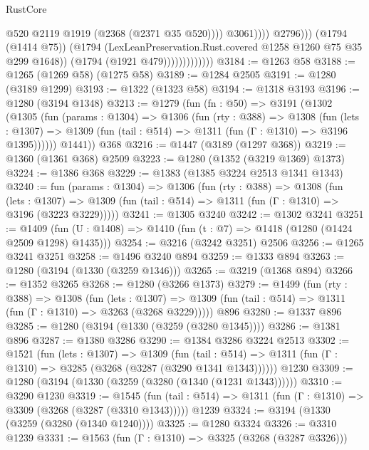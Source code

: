 \begin{lexlean}{RustCore}
\begin{coremodule}
                                            @520
                                            @2119
                                            @1919
                                            (@2368 (@2371 @35 @520))))
                                        @3061))))
                                @2796)))
                          (@1794 (@1414 @75))
                          (@1794 (LexLeanPreservation.Rust.covered @1258 @1260 @75 @35 @299 @1648))
                          (@1794 (@1921 @479)))))))))))))
@3184 := @1263 @58
@3188 := @1265 (@1269 @58) (@1275 @58)
@3189 := @1284 @2505
@3191 := @1280 (@3189 @1299)
@3193 := @1322 (@1323 @58)
@3194 := @1318 @3193
@3196 := @1280 (@3194 @1348)
@3213 := @1279
    (fun (fn : @50) =>
    @3191
      (@1302
        (@1305
          (fun (params : @1304) =>
          @1306
            (fun (rty : @388) =>
            @1308
              (fun (lets : @1307) =>
              @1309 (fun (tail : @514) => @1311 (fun (Γ : @1310) => @3196 @1395))))))
        @1441))
    @368
@3216 := @1447 (@3189 (@1297 @368))
@3219 := @1360 (@1361 @368) @2509
@3223 := @1280 (@1352 (@3219 @1369) @1373)
@3224 := @1386 @368
@3229 := @1383 (@1385 @3224 @2513 @1341 @1343)
@3240 := fun (params : @1304) =>
  @1306
    (fun (rty : @388) =>
    @1308
      (fun (lets : @1307) =>
      @1309 (fun (tail : @514) => @1311 (fun (Γ : @1310) => @3196 (@3223 @3229)))))
@3241 := @1305 @3240
@3242 := @1302 @3241
@3251 := @1409 (fun (U : @1408) => @1410 (fun (t : @7) => @1418 (@1280 (@1424 @2509 @1298) @1435)))
@3254 := @3216 (@3242 @3251) @2506
@3256 := @1265 @3241 @3251
@3258 := @1496 @3240 @894
@3259 := @1333 @894
@3263 := @1280 (@3194 (@1330 (@3259 @1346)))
@3265 := @3219 (@1368 @894)
@3266 := @1352 @3265
@3268 := @1280 (@3266 @1373)
@3279 := @1499
    (fun (rty : @388) =>
    @1308
      (fun (lets : @1307) =>
      @1309 (fun (tail : @514) => @1311 (fun (Γ : @1310) => @3263 (@3268 @3229)))))
    @896
@3280 := @1337 @896
@3285 := @1280 (@3194 (@1330 (@3259 (@3280 @1345))))
@3286 := @1381 @896
@3287 := @1380 @3286
@3290 := @1384 @3286 @3224 @2513
@3302 := @1521
    (fun (lets : @1307) =>
    @1309
      (fun (tail : @514) => @1311 (fun (Γ : @1310) => @3285 (@3268 (@3287 (@3290 @1341 @1343))))))
    @1230
@3309 := @1280 (@3194 (@1330 (@3259 (@3280 (@1340 (@1231 @1343))))))
@3310 := @3290 @1230
@3319 := @1545
    (fun (tail : @514) => @1311 (fun (Γ : @1310) => @3309 (@3268 (@3287 (@3310 @1343)))))
    @1239
@3324 := @3194 (@1330 (@3259 (@3280 (@1340 @1240))))
@3325 := @1280 @3324
@3326 := @3310 @1239
@3331 := @1563 (fun (Γ : @1310) => @3325 (@3268 (@3287 @3326)))

\end{coremodule}
\end{lexlean}
